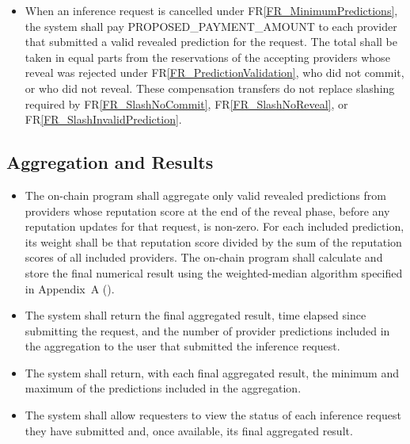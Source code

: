 \documentclass[12pt]{article}
\newcounter{reqnum} %
\newcommand{\rref}[1]{FR\ref{#1}}
\begin{document}
\begin{itemize}
\item[FR\refstepcounter{reqnum}\thereqnum \label{FR_CancellationCompensation}:] When an inference request is cancelled under \rref{FR_MinimumPredictions}, the system shall pay PROPOSED\_PAYMENT\_AMOUNT to each provider that submitted a valid revealed prediction for the request. The total shall be taken in equal parts from the reservations of the accepting providers whose reveal was rejected under \rref{FR_PredictionValidation}, who did not commit, or who did not reveal. These compensation transfers do not replace slashing required by \rref{FR_SlashNoCommit}, \rref{FR_SlashNoReveal}, or \rref{FR_SlashInvalidPrediction}.

\end{itemize}

\subsection{Aggregation and Results}

\noindent \begin{itemize}

\item[FR\refstepcounter{reqnum}\thereqnum \label{FR_PredictionAggregation}:] The on-chain program shall aggregate only valid revealed predictions from providers whose reputation score at the end of the reveal phase, before any reputation updates for that request, is non-zero. For each included prediction, its weight shall be that reputation score divided by the sum of the reputation scores of all included providers. The on-chain program shall calculate and store the final numerical result using the weighted-median algorithm specified in Appendix~A ().

\item[FR\refstepcounter{reqnum}\thereqnum \label{FR_FinalResultDelivery}:] The system shall return the final aggregated result, time elapsed since submitting the request, and the number of provider predictions included in the aggregation to the user that submitted the inference request.

\item[FR\refstepcounter{reqnum}\thereqnum \label{FR_ResultSpread}:] The system shall return, with each final aggregated result, the minimum and maximum of the predictions included in the aggregation.

\item[FR\refstepcounter{reqnum}\thereqnum \label{FR_RequestHistory}:] The system shall allow requesters to view the status of each inference request they have submitted and, once available, its final aggregated result.

\end{itemize}
\end{document}
